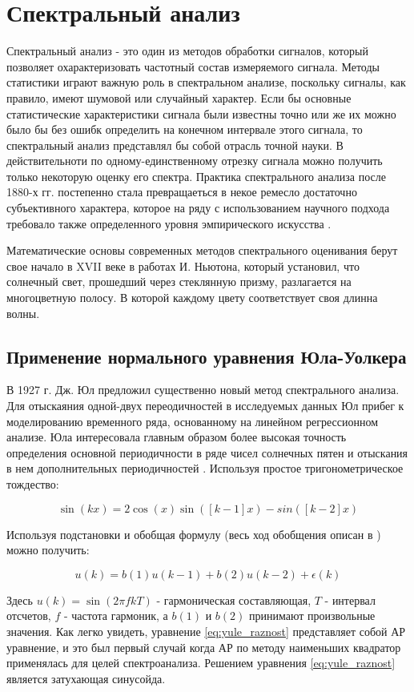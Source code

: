 \section{Спектральный анализ}
Спектральный анализ - это один из методов обработки сигналов, который позволяет охарактеризовать частотный состав измеряемого сигнала.
Методы статистики играют важную роль в спектральном анализе, поскольку сигналы, как правило, имеют шумовой или случайный характер. Если бы
основные статистические характеристики сигнала были известны точно или же их можно было бы без ошибк определить на конечном интервале этого
сигнала, то спектральный анализ представлял бы собой отрасль точной науки. В действительноти по одному-единственному отрезку сигнала можно
получить только некоторую оценку его спектра. Практика спектрального анализа после 1880-х гг. постепенно стала превращаеться в некое ремесло
достаточно субъективного характера, которое на ряду с использованием научного подхода требовало также определенного уровня эмпирического
искусства \cite{marpl_book}.

Математические основы современных методов спектрального оценивания берут свое начало в XVII веке в работах И. Ньютона, который установил, что
солнечный свет, прошедший через стеклянную призму, разлагается на многоцветную полосу. В которой каждому цвету соответствует своя длинна волны.

\subsection{Применение нормального уравнения Юла-Уолкера}
В 1927 г. Дж. Юл предложил существенно новый метод спектрального анализа. Для отыскаяния одной-двух переодичностей в исследуемых данных Юл
прибег к моделированию временного ряда, основанному на линейном регрессионном анализе. Юла интересовала главным образом более высокая точность
определения основной периодичности в ряде чисел солнечных пятен и отыскания в нем дополнительных периодичностей \cite{marpl_book}.
Используя простое тригонометрическое тождество:
\begin{center}
\begin{equation}
	\label{eq:yule_trigonometric}
	\sin(kx)=2\cos(x)\sin([k-1]x)-sin([k-2]x)
\end{equation}
\end{center}
Используя подстановки и обобщая формулу (весь ход обобщения описан в \cite{marpl_book}) можно получить:
\begin{center}
\begin{equation}
	\label{eq:yule_raznost}
	u(k) = b(1)u(k-1) + b(2)u(k-2) + \epsilon (k)
\end{equation}
\end{center}
Здесь ${u(k) = \sin (2\pi fkT)}$ - гармоническая составляющая, ${T}$ - интервал отсчетов, ${f}$ - частота гармоник, а
${b(1)}$ и ${b(2)}$ принимают произвольные значения. Как легко увидеть, уравнение \ref{eq:yule_raznost} представляет собой АР уравнение, и это был
первый случай когда АР по методу наименьших квадратор применялась для целей спектроанализа. Решением уравнения \ref{eq:yule_raznost}
является затухающая синусойда.


